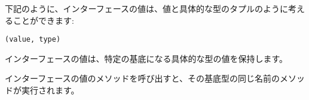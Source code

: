 下記のように、インターフェースの値は、値と具体的な型のタプルのように考えることができます:

\begin{lstlisting}[numbers=none]
(value, type)
\end{lstlisting}

インターフェースの値は、特定の基底になる具体的な型の値を保持します。

インターフェースの値のメソッドを呼び出すと、その基底型の同じ名前のメソッドが実行されます。